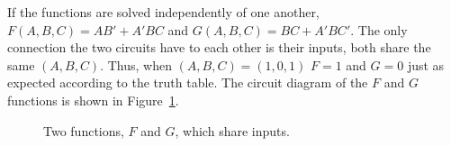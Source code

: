 \begin{changemargin}{1.5cm}{1.5cm}
If the functions are solved independently of one another,
$F(A,B,C)=AB'+A'BC$ and $G(A,B,C) = BC + A'BC'$.  The only
connection the two circuits have to each other is their inputs, both
share the same $(A,B,C)$.  Thus, when $(A,B,C) = (1,0,1)$
$F=1$ and $G=0$ just as expected according to
the truth table.  The circuit diagram of the $F$ and $G$
functions is shown in Figure~\ref{fig:minimizationMultiOut}.

\end{changemargin}

\begin{figure}[ht]
\caption{Two functions, $F$ and $G$, which share inputs.}
\label{fig:minimizationMultiOut}
\end{figure}

